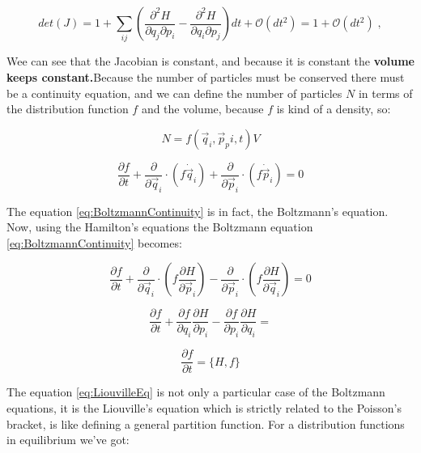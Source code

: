 \documentclass[spanish,notitlepage,letterpaper,11pt]{article} %
\numberwithin{equation}{subsection}
\begin{document}
        \begin{equation}
            det(J) = 1 + \sum_{ij}\left(\frac{\partial^2 H}{\partial q_j \partial p_i} - \frac{\partial^2 H}{\partial q_i \partial p_j} \right)dt + \mathcal{O}(dt^2) = 1 + \mathcal{O}(dt^2) \;,
        \end{equation}

        Wee can see that the Jacobian is constant, and because it is constant the \textbf{volume keeps constant.}Because the number of particles must be conserved there must be a continuity equation, and we can define the number of particles $N$ in terms of the distribution function $f$ and the volume, because $f$ is kind of a density, so:

        \begin{equation}
            N = f(\Vec{q}_i,\Vec{p}_pi,t)V
        \end{equation}

        \begin{equation}\label{eq:BoltzmannContinuity}
            \frac{\partial f}{\partial t} + \frac{\partial}{\partial \Vec{q}_i}\cdot (f\Dot{\Vec{q}}_i) + \frac{\partial}{\partial \Vec{p}_i}\cdot(f\Dot{\Vec{p}}_i) = 0
        \end{equation}

        The equation \ref{eq:BoltzmannContinuity} is in fact, the Boltzmann's equation. Now, using the Hamilton's equations the Boltzmann equation  \ref{eq:BoltzmannContinuity} becomes:

        \begin{equation*}
            \frac{\partial f}{\partial t} + \frac{\partial}{\partial \Vec{q}_i}\cdot (f\frac{\partial H}{\partial \Vec{p}_i}) - \frac{\partial}{\partial \Vec{p}_i}\cdot(f\frac{\partial H}{\partial \Vec{q}_i}) = 0
        \end{equation*}

        \begin{equation}
            \frac{\partial f}{\partial t} + \frac{\partial f}{\partial q_i}\frac{\partial H}{\partial p_i} - \frac{\partial f}{\partial p_i}\frac{\partial H}{\partial q_i} =
        \end{equation}

        \begin{equation}\label{eq:LiouvilleEq}
            \frac{\partial f}{\partial t} = \{H,f\}
        \end{equation}

        The equation \ref{eq:LiouvilleEq} is not only a particular case of the Boltzmann equations, it is the Liouville's equation which is strictly related to the Poisson's bracket, is like defining a general partition function. For a distribution functions in equilibrium we've got:
\end{document}

